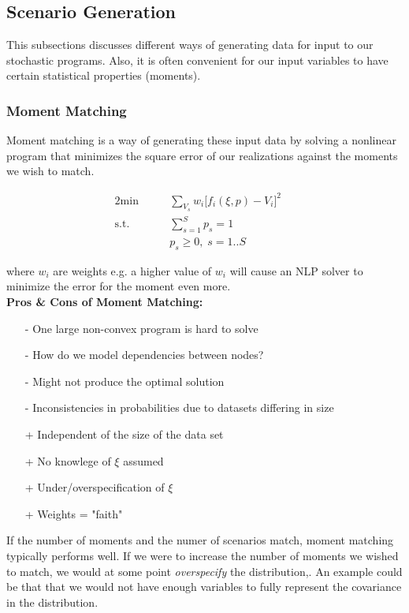 \subsection{Scenario Generation}

This subsections discusses different ways of generating data for input to our
stochastic programs. Also, it is often convenient for our input variables to
have certain statistical properties (moments).

\subsubsection{Moment Matching}

Moment matching is a way of generating these input data by solving a nonlinear
program that minimizes the square error of our realizations against the moments
we wish to match.

\begin{alignat*}{2}
\textrm{min}& \quad \quad \sum_{V_s} w_i \big[ f_i(\xi, p) - V_i \big]^2 \ \\
\text{s.t.} & \quad \quad \sum_{s=1}^S p_s = 1 & \ \\
            & \quad \quad p_s \geq 0, \; s=1..S & \
\end{alignat*}

where $w_i$ are weights e.g. a higher value of $w_i$ will cause an NLP solver to
minimize the error for the moment even more.\\

{\large\bf Pros \& Cons of Moment Matching:}
\begin{itemize}
\item[-] One large non-convex program is hard to solve
\item[-] How do we model dependencies between nodes?
\item[-] Might not produce the optimal solution
\item[-] Inconsistencies in probabilities due to datasets differing in size
\item[+] Independent of the size of the data set
\item[+] No knowlege of $\xi$ assumed
\item[+] Under/overspecification of $\xi$
\item[+] Weights = "faith"
\end{itemize}

If the number of moments and the numer of scenarios match, moment matching typically
performs well. If we were to increase the number of moments we wished to match, we 
would at some point \emph{overspecify} the distribution,. An example could be that that
we would not have enough variables to fully represent the covariance in the
distribution.\\

